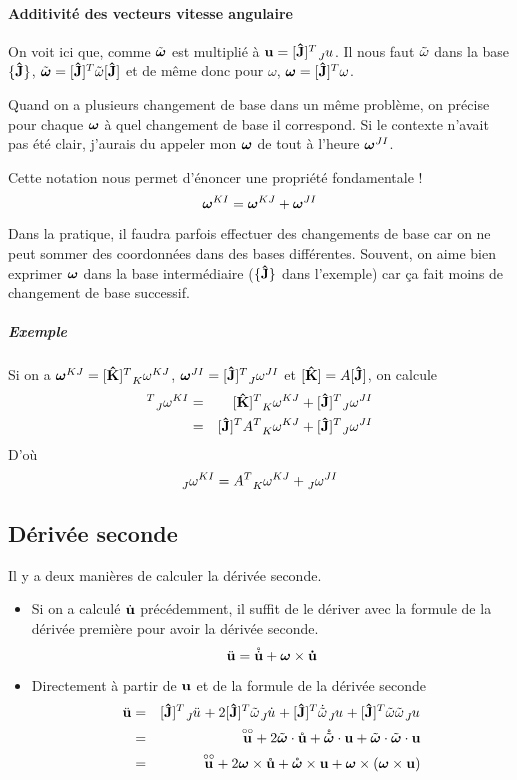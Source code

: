 \paragraph{Additivité des vecteurs vitesse angulaire}

On voit ici que, comme $\tilde{\bm \omega}$ est multiplié à $\fv{u} = [\uj]^T \wrt{J}{u}$.
Il nous faut $\tilde{\omega}$ dans la base $\{{\bf\hat{J}}\}$, $\tilde{\bm \omega} = [{\bf\hat{J}}]^T \tilde{\omega} [{\bf\hat{J}}]$ et de même donc pour $\omega$, ${\bm \omega} = [{\bf\hat{J}}]^T \omega$.

Quand on a plusieurs changement de base dans un même problème, on précise pour chaque ${\bm \omega}$ à quel changement de base il correspond.
Si le contexte n'avait pas été clair, j'aurais du appeler mon ${\bm \omega}$ de tout à l'heure ${\bm \omega}^{JI}$.

Cette notation nous permet d'énoncer une propriété fondamentale !
\[ {\bm \omega}^{KI} = {\bm \omega}^{KJ} + {\bm \omega}^{JI} \]

Dans la pratique, il faudra parfois effectuer des changements de base car on ne peut sommer des coordonnées dans des bases différentes.
Souvent, on aime bien exprimer ${\bm \omega}$ dans la base intermédiaire ($\{{\bf\hat{J}}\}$ dans l'exemple) car ça fait moins de changement de base successif.

\subparagraph{Exemple}
Si on a $\omegaf^{KJ} = [\uk]^T \wtr{K}{\omega}{KJ}$, $\omegaf^{JI} = [\uj]^T \wtr{J}{\omega}{JI}$ et $[{\bf\hat{K}}] = A[{\bf\hat{J}}]$, on calcule
\begin{eqnarray*}
  [\uj]^T \wtr{J}{\omega}{KI} &=& [\uk]^T \wtr{K}{\omega}{KJ} + [\uj]^T \wtr{J}{\omega}{JI}\\
                              &=& [\uj]^T A^T \wtr{K}{\omega}{KJ} + [\uj]^T \wtr{J}{\omega}{JI}
\end{eqnarray*}
D'où
\[ \wtr{J}{\omega}{KI} = A^T \wtr{K}{\omega}{KJ} + \wtr{J}{\omega}{JI} \]

\subsection{Dérivée seconde}
Il y a deux manières de calculer la dérivée seconde.
\begin{itemize}
  \item
    Si on a calculé $\dot{\bf u}$ précédemment, il suffit de le dériver avec la formule de la dérivée première pour avoir la dérivée seconde.
    \[ \ddot{\bf u} = \mathring{\dot{\bf u}} + {\bm \omega} \times \dot{\bf u} \]
  \item
    Directement à partir de ${\bf u}$ et de la formule de la dérivée seconde
    \begin{eqnarray*}
      \fvdd{u} &=&  [\uj]^T \wrt{J}{\ddot{u}} + 2 [\uj]^T \omegat\wrt{J}{\dot{u}} + [\uj]^T \dot{\omegat}\wrt{J}{u} + [\uj]^T \omegat\omegat\wrt{J}{u}\\
               &=& \fvrr{u} + 2 \omegaft \cdot \fvr{u} + \omegaftr \cdot \fv{u} + \omegaft \cdot \omegaft \cdot \fv{u}\\
               &=& \fvrr{u} + 2 \omegaf \times \fvr{u} + \omegafr \times \fv{u} + \omegaf \times (\omegaf \times \fv{u})
    \end{eqnarray*}
\end{itemize}

